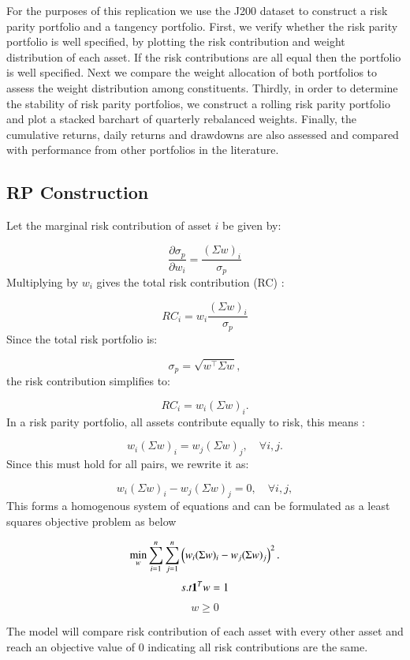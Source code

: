 \documentclass[preprint, 3p,
authoryear]{elsarticle} %
\begin{document}
For the purposes of this replication we use the J200 dataset to
construct a risk parity portfolio and a tangency portfolio. First, we
verify whether the risk parity portfolio is well specified, by plotting
the risk contribution and weight distribution of each asset. If the risk
contributions are all equal then the portfolio is well specified. Next
we compare the weight allocation of both portfolios to assess the weight
distribution among constituents. Thirdly, in order to determine the
stability of risk parity portfolios, we construct a rolling risk parity
portfolio and plot a stacked barchart of quarterly rebalanced weights.
Finally, the cumulative returns, daily returns and drawdowns are also
assessed and compared with performance from other portfolios in the
literature.

\hypertarget{rp-construction}{%
\subsection{RP Construction}\label{rp-construction}}

Let the marginal risk contribution of asset \(i\) be given by:

\[ 
\frac{\partial\sigma_{p}}{\partial{w}_{i}} = \frac{(\Sigma{w})_i}{\sigma_p}
\] Multiplying by \(w_i\) gives the total risk contribution (RC) :

\[
RC_i = w_i \frac{(\Sigma w)_i}{\sigma_p}
\] Since the total risk portfolio is:

\[
\sigma_p = \sqrt{w^\top \Sigma w},
\] the risk contribution simplifies to:

\[
RC_i = w_i (\Sigma w)_i.
\] In a risk parity portfolio, all assets contribute equally to risk,
this means :

\[
w_i (\Sigma w)_i = w_j (\Sigma w)_j, \quad \forall i, j.
\] Since this must hold for all pairs, we rewrite it as:

\[
w_i (\Sigma w)_i - w_j (\Sigma w)_j = 0, \quad \forall i, j,
\] This forms a homogenous system of equations and can be formulated as
a least squares objective problem as below

\[
\min_w \sum_{i=1}^n\sum_{j=1}^n \left( w_i (\Sigma w)_i - w_j (\Sigma w)_j \right)^2.\\
\] \[s.t \space \space \mathbf{1}^Tw= 1 \\\]

\[w \geq 0\]

The model will compare risk contribution of each asset with every other
asset and reach an objective value of 0 indicating all risk
contributions are the same.
\end{document}
